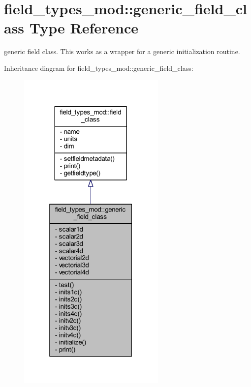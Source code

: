 \hypertarget{structfield__types__mod_1_1generic__field__class}{}\section{field\+\_\+types\+\_\+mod\+:\+:generic\+\_\+field\+\_\+class Type Reference}
\label{structfield__types__mod_1_1generic__field__class}


generic field class. This works as a wrapper for a generic initialization routine.  




Inheritance diagram for field\+\_\+types\+\_\+mod\+:\+:generic\+\_\+field\+\_\+class\+:\nopagebreak
\begin{figure}[H]
\begin{center}
\leavevmode
\includegraphics[width=205pt]{structfield__types__mod_1_1generic__field__class__inherit__graph}
\end{center}
\end{figure}


